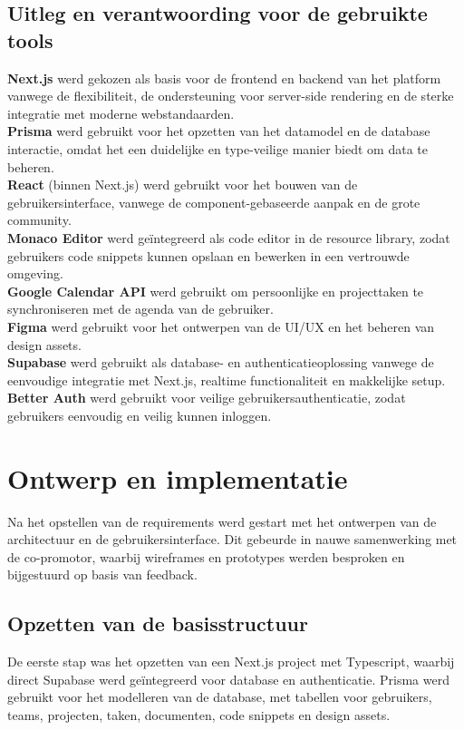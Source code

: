 \subsection{Uitleg en verantwoording voor de gebruikte tools}
\textbf{Next.js} werd gekozen als basis voor de frontend en backend van het platform vanwege de flexibiliteit, de ondersteuning voor server-side rendering en de sterke integratie met moderne webstandaarden. \\
\textbf{Prisma} werd gebruikt voor het opzetten van het datamodel en de database interactie, omdat het een duidelijke en type-veilige manier biedt om data te beheren. \\
\textbf{React} (binnen Next.js) werd gebruikt voor het bouwen van de gebruikersinterface, vanwege de component-gebaseerde aanpak en de grote community. \\
\textbf{Monaco Editor} werd geïntegreerd als code editor in de resource library, zodat gebruikers code snippets kunnen opslaan en bewerken in een vertrouwde omgeving. \\
\textbf{Google Calendar API} werd gebruikt om persoonlijke en projecttaken te synchroniseren met de agenda van de gebruiker. \\
\textbf{Figma} werd gebruikt voor het ontwerpen van de UI/UX en het beheren van design assets. \\
\textbf{Supabase} werd gebruikt als database- en authenticatieoplossing vanwege de eenvoudige integratie met Next.js, realtime functionaliteit en makkelijke setup. \\
\textbf{Better Auth} werd gebruikt voor veilige gebruikersauthenticatie, zodat gebruikers eenvoudig en veilig kunnen inloggen.

\section{Ontwerp en implementatie}
Na het opstellen van de requirements werd gestart met het ontwerpen van de architectuur en de gebruikersinterface. Dit gebeurde in nauwe samenwerking met de co-promotor, waarbij wireframes en prototypes werden besproken en bijgestuurd op basis van feedback.

\subsection{Opzetten van de basisstructuur}
De eerste stap was het opzetten van een Next.js project met Typescript, waarbij direct Supabase werd geïntegreerd voor database en authenticatie. Prisma werd gebruikt voor het modelleren van de database, met tabellen voor gebruikers, teams, projecten, taken, documenten, code snippets en design assets.

